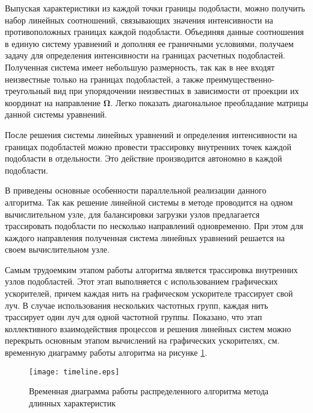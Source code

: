 Выпуская характеристики из каждой точки границы подобласти, можно получить набор линейных соотношений, связывающих значения интенсивности на противоположных границах каждой подобласти. Объединяя данные соотношения в единую систему уравнений и дополняя ее граничными условиями, получаем задачу для определения интенсивности на границах расчетных подобластей. Полученная система имеет небольшую размерность, так как в нее входят неизвестные только на границах подобластей, а также преимущественно-треугольный вид при упорядочении неизвестных в зависимости от проекции их координат на направление $\boldsymbol \Omega$. Легко показать диагональное преобладание матрицы данной системы уравнений.

После решения системы линейных уравнений и определения интенсивности на границах подобластей можно провести трассировку внутренних точек каждой подобласти в отдельности. Это действие производится автономно в каждой подобласти.

В  приведены основные особенности параллельной реализации данного алгоритма. Так как решение линейной системы в методе проводится на одном вычислительном узле, для балансировки загрузки узлов предлагается трассировать подобласти по несколько направлений одновременно. При этом для каждого направления полученная система линейных уравнений решается на своем вычислительном узле.

Самым трудоемким этапом работы алгоритма является трассировка внутренних узлов подобластей. Этот этап выполняется с использованием графических ускорителей, причем каждая нить на графическом ускорителе трассирует свой луч. В случае использования нескольких частотных групп, каждая нить трассирует один луч для одной частотной группы.
Показано, что этап коллективного взаимодействия процессов и решения линейных систем можно перекрыть основным этапом вычислений на графических ускорителях, см. временную диаграмму работы алгоритма на рисунке \ref{fig:timeline}.
\begin{figure}[ht!]
\centering
\texttt{[image: timeline.eps]}
\caption{Временная диаграмма работы распределенного алгоритма метода длинных характеристик}
\label{fig:timeline}
\end{figure}


